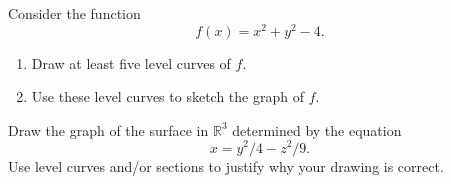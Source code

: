 \documentclass{ximera}
\begin{document}
\begin{problem}
Consider the function 
\[
f(x) = x^2 + y^2 - 4.
\]
\begin{enumerate}
\item Draw at least five level curves of $f$.
\item Use these level curves to sketch the graph of $f$.
\end{enumerate}
\end{problem}

\begin{problem}
Draw the graph of the surface in $\mathbb{R}^3$ determined by the equation
\[
x = y^2/4 - z^2/9.
\]
Use level curves and/or sections to justify why your drawing is correct.
\end{problem}
\end{document}
